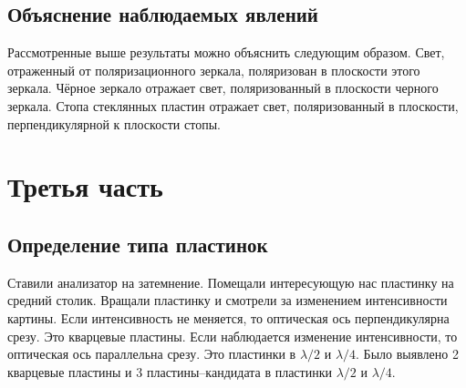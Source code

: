 \documentclass[12pt]{article}
\begin{document}
	\subsection{Объяснение наблюдаемых явлений}
	Рассмотренные выше результаты можно объяснить следующим образом. Свет, отраженный от поляризационного зеркала, поляризован в плоскости этого зеркала. Чёрное зеркало отражает свет, поляризованный в плоскости черного зеркала. Стопа стеклянных пластин отражает свет, поляризованный в плоскости, перпендикулярной к плоскости стопы.

	\section{Третья часть}
	\subsection{Определение типа пластинок}
	Ставили анализатор на затемнение. Помещали интересующую нас пластинку на средний столик. Вращали пластинку и смотрели за изменением интенсивности картины. Если интенсивность не меняется, то оптическая ось перпендикулярна срезу. Это кварцевые пластины. Если наблюдается изменение интенсивности, то оптическая ось параллельна срезу. Это пластинки в $\lambda/2$ и $\lambda/4$. Было выявлено 2 кварцевые пластины и 3 пластины\---кандидата в пластинки $\lambda/2$ и $\lambda/4$.
\end{document}
